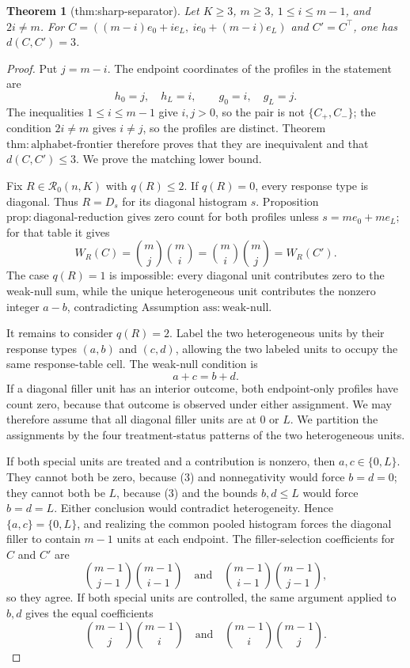 \documentclass{article}
\newtheorem{theorem}{Theorem}
\begin{document}
\begin{theorem}[thm:sharp-separator]\label{thm:sharp-separator}
Let \(K\geq3\), \(m\geq3\), \(1\leq i\leq m-1\), and \(2i\neq m\). For \(C=((m-i)e_0+ie_L,\ ie_0+(m-i)e_L)\) and \(C'=C^\top\), one has \(d(C,C')=3\).
\end{theorem}
\begin{proof}
Put \(j=m-i\). The endpoint coordinates of the profiles in the statement are
\[
 h_0=j,\quad h_L=i,\qquad g_0=i,\quad g_L=j.
 \tag{1}
\]
The inequalities \(1\leq i\leq m-1\) give \(i,j>0\), so the pair is not \(\{C_+,C_-\}\); the condition \(2i\neq m\) gives \(i\neq j\), so the profiles are distinct. Theorem \(\mathrm{thm{:}alphabet\text{-}frontier}\) therefore proves that they are inequivalent and that \(d(C,C')\leq3\). We prove the matching lower bound.

Fix \(R\in\mathcal R_0(n,K)\) with \(q(R)\leq2\). If \(q(R)=0\), every response type is diagonal. Thus \(R=D_s\) for its diagonal histogram \(s\). Proposition \(\mathrm{prop{:}diagonal\text{-}reduction}\) gives zero count for both profiles unless \(s=me_0+me_L\); for that table it gives
\[
 W_R(C)=\binom mj\binom mi
 =\binom mi\binom mj=W_R(C').
 \tag{2}
\]
The case \(q(R)=1\) is impossible: every diagonal unit contributes zero to the weak-null sum, while the unique heterogeneous unit contributes the nonzero integer \(a-b\), contradicting Assumption \(\mathrm{ass{:}weak\text{-}null}\).

It remains to consider \(q(R)=2\). Label the two heterogeneous units by their response types \((a,b)\) and \((c,d)\), allowing the two labeled units to occupy the same response-table cell. The weak-null condition is
\[
 a+c=b+d.
 \tag{3}
\]
If a diagonal filler unit has an interior outcome, both endpoint-only profiles have count zero, because that outcome is observed under either assignment. We may therefore assume that all diagonal filler units are at \(0\) or \(L\). We partition the assignments by the four treatment-status patterns of the two heterogeneous units.

If both special units are treated and a contribution is nonzero, then \(a,c\in\{0,L\}\). They cannot both be zero, because (3) and nonnegativity would force \(b=d=0\); they cannot both be \(L\), because (3) and the bounds \(b,d\leq L\) would force \(b=d=L\). Either conclusion would contradict heterogeneity. Hence \(\{a,c\}=\{0,L\}\), and realizing the common pooled histogram forces the diagonal filler to contain \(m-1\) units at each endpoint. The filler-selection coefficients for \(C\) and \(C'\) are
\[
 \binom{m-1}{j-1}\binom{m-1}{i-1}
 \quad\text{and}\quad
 \binom{m-1}{i-1}\binom{m-1}{j-1},
 \tag{4}
\]
so they agree. If both special units are controlled, the same argument applied to \(b,d\) gives the equal coefficients
\[
 \binom{m-1}{j}\binom{m-1}{i}
 \quad\text{and}\quad
 \binom{m-1}{i}\binom{m-1}{j}.
 \tag{5}
\]


\end{proof}
\end{document}
